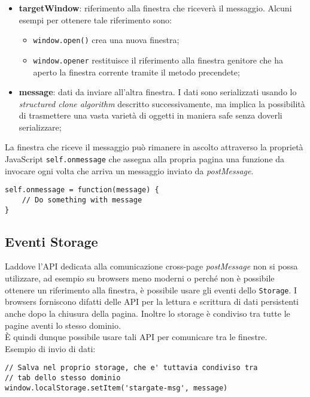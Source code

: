 \begin{itemize}
    \item \textbf{targetWindow}: riferimento alla finestra che riceverà il messaggio. Alcuni esempi per ottenere tale riferimento sono:
        \begin{itemize}
            \item \texttt{window.open()} crea una nuova finestra;
            \item \texttt{window.opener} restituisce il riferimento alla finestra genitore che ha aperto la finestra corrente tramite il metodo precendete;
        \end{itemize}
    \item \textbf{message}: dati da inviare all'altra finestra. I dati sono serializzati usando lo \textit{structured clone algorithm} descritto successivamente, ma implica la possibilità di trasmettere una vasta varietà di oggetti in maniera safe senza doverli serializzare;
\end{itemize}

La finestra che riceve il messaggio può rimanere in ascolto attraverso la proprietà JavaScript \texttt{self.onmessage} che assegna alla propria pagina una funzione da invocare ogni volta che arriva un messaggio inviato da \textit{postMessage}.

\begin{lstlisting}
self.onmessage = function(message) {
    // Do something with message
}
\end{lstlisting}

\subsection{Eventi Storage}

Laddove l'API dedicata alla comunicazione cross-page \textit{postMessage} non si possa utilizzare, ad esempio su browsers meno moderni o perché non è possibile ottenere un riferimento alla finestra, è possibile usare gli eventi dello \texttt{Storage}. I browsers forniscono difatti delle API per la lettura e scrittura di dati persistenti anche dopo la chiusura della pagina. Inoltre lo storage è condiviso tra tutte le pagine aventi lo stesso dominio. \\

È quindi dunque possibile usare tali API per comunicare tra le finestre. \\

Esempio di invio di dati:

\begin{lstlisting}
// Salva nel proprio storage, che e' tuttavia condiviso tra 
// tab dello stesso dominio
window.localStorage.setItem('stargate-msg', message)
\end{lstlisting}

